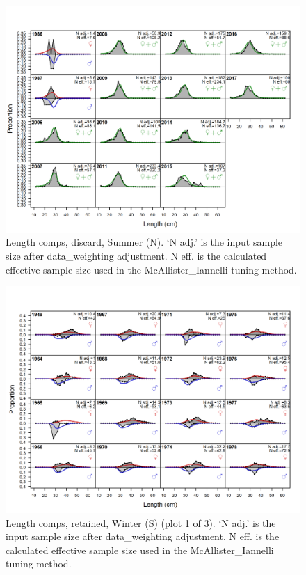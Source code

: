\documentclass[12pt,]{article}
\begin{document}
\begin{figure}
\centering
\includegraphics{r4ss/plots_mod1/comp_lenfit_flt2mkt1.png}
\caption{Length comps, discard, Summer (N). `N adj.' is the input sample
size after data\_weighting adjustment. N eff. is the calculated
effective sample size used in the McAllister\_Iannelli tuning method.
\label{fig:length_fits}}
\end{figure}

\begin{figure}
\centering
\includegraphics{r4ss/plots_mod1/comp_lenfit_flt3mkt2_page1.png}
\caption{Length comps, retained, Winter (S) (plot 1 of 3). `N adj.' is
the input sample size after data\_weighting adjustment. N eff. is the
calculated effective sample size used in the McAllister\_Iannelli tuning
method. \label{fig:length_fits}}
\end{figure}
\end{document}
